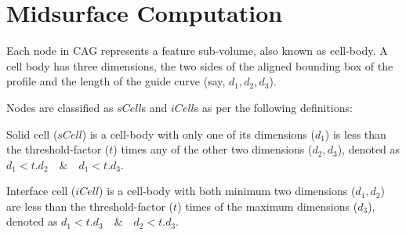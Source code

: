 %
%
				


\section{Midsurface Computation}
\label{sec:midsurface}

Each node in CAG represents a feature sub-volume, also known as cell-body. A cell body has three dimensions, the two sides of the aligned bounding box of the profile and the length of the guide curve (say, $d_1,d_2,d_3$).
%

Nodes are classified as $sCell$s and $iCell$s as per the following definitions:
\begin{mydef}
\label{def:scell}
Solid cell ($sCell$) is a cell-body with only one of its dimensions ($d_1$) is less than the threshold-factor ($t$) times any of the other two dimensions ($d_2, d_3$), denoted as  $d_1 < t.d_2 \quad \&  \quad d_1 < t.d_3$. %
\end{mydef}
\begin{mydef}
\label{def:icell}
Interface cell ($iCell$) is a cell-body with  both minimum two dimensions ($d_1,d_2$)  are less than the threshold-factor ($t$) times of the maximum dimensions ($d_3$), denoted as  $d_1 < t.d_3 \quad \&  \quad d_2 < t.d_3$. %
\end{mydef}

